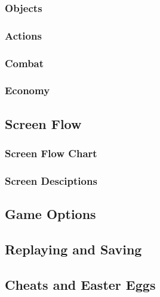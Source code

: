 \subsubsection{Objects}



\subsubsection{Actions}





\subsubsection{Combat}

\subsubsection{Economy}

\subsection{Screen Flow}

\subsubsection{Screen Flow Chart}

\subsubsection{Screen Desciptions}




\subsection{Game Options}

\subsection{Replaying and Saving}

\subsection{Cheats and Easter Eggs}

\newpage
